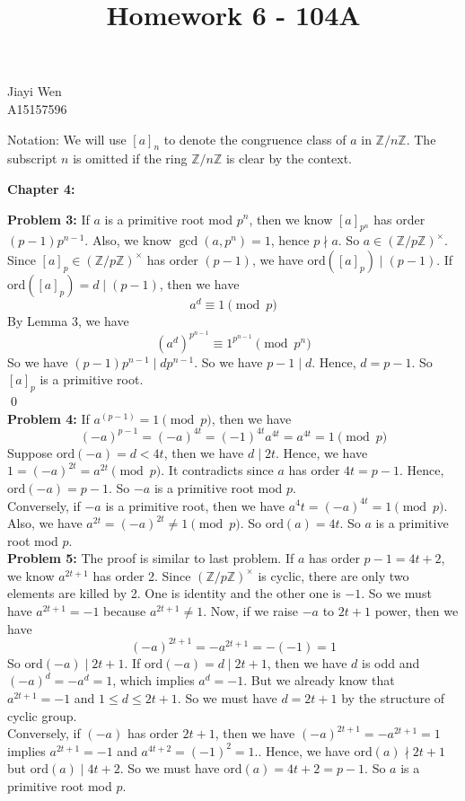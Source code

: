 \documentclass[12pt]{amsart}
\newcommand{\Z}{\mathbb{Z}}
\newcommand{\ord}{\mathrm{ord}}
\begin{document}
\title{Homework 6 - 104A}
\maketitle
\begin{center}
    Jiayi Wen\\
    A15157596
\end{center}
Notation: We will use $[a]_n$ to denote the congruence class of $a$ in $\Z/n\Z$. The subscript $n$ is omitted if the ring $\Z/n\Z$ is clear by the context.
\begin{center}
    \textbf{Chapter 4:}
\end{center}
\textbf{Problem 3:} If $a$ is a primitive root mod $p^n$, then we know $[a]_{p^n}$ has order $(p-1)p^{n-1}$. Also, we know $\gcd(a,p^n)=1$, hence $p\nmid a$. So $a\in (\Z/p\Z)^\times$. Since $[a]_p\in (\Z/p\Z)^\times$ has order $(p-1)$, we have $\ord([a]_p)\mid (p-1)$. If $\ord([a]_p)=d\mid (p-1)$, then we have 
\[a^d\equiv 1\pmod p\]
By Lemma 3, we have 
\[(a^d)^{p^{n-1}}\equiv 1^{p^{n-1}}\pmod{p^n}\]
So we have $(p-1)p^{n-1}\mid dp^{n-1}$. So we have $p-1\mid d$. Hence, $d=p-1$. So $[a]_p$ is a primitive root.
\\\qed\\
\textbf{Problem 4:} If $a^(p-1)=1\pmod p$, then we have 
\[(-a)^{p-1}=(-a)^{4t}=(-1)^{4t}a^{4t}=a^{4t}=1\pmod p\]
Suppose $\ord(-a)=d<4t$, then we have $d\mid 2t$. Hence, we have $1=(-a)^{2t}=a^{2t}\pmod p$. It contradicts since $a$ has order $4t=p-1$. Hence, $\ord(-a)=p-1$. So $-a$ is a primitive root mod $p$.\\
Conversely, if $-a$ is a primitive root, then we have $a^4t=(-a)^{4t}=1\pmod p$. Also, we have $a^{2t}=(-a)^{2t}\neq 1\pmod p$. So $\ord(a)=4t$. So $a$ is a primitive root mod $p$.\\
\textbf{Problem 5:} The proof is similar to last problem. If $a$ has order $p-1=4t+2$, we know $a^{2t+1}$ has order 2. Since $(\Z/p\Z)^\times$ is cyclic, there are only two elements are killed by 2. One is identity and the other one is $-1$. So we must have $a^{2t+1}=-1$ because $a^{2t+1}\neq 1$. Now, if we raise $-a$ to $2t+1$ power, then we have 
\[(-a)^{2t+1}=-a^{2t+1}=-(-1)=1\]
So $\ord(-a)\mid 2t+1$. If $\ord(-a)=d\mid 2t+1$, then we have $d$ is odd and $(-a)^d=-a^d=1$, which implies $a^d=-1$. But we already know that $a^{2t+1}=-1$ and $1\leq d\leq 2t+1$. So we must have $d=2t+1$ by the structure of cyclic group.\\
Conversely, if $(-a)$ has order $2t+1$, then we have $(-a)^{2t+1}=-a^{2t+1}=1$ implies $a^{2t+1}=-1$ and $a^{4t+2}=(-1)^2=1$.. Hence, we have $\ord(a)\nmid 2t+1$ but $\ord(a)\mid 4t+2$. So we must have $\ord(a)=4t+2=p-1$. So $a$ is a primitive root mod $p$.
\end{document}
